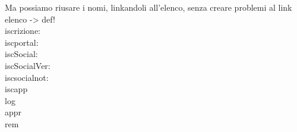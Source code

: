 Ma possiamo riusare i nomi, linkandoli all'elenco, senza creare problemi al link elenco -> def!\\
iscrizione:   \\
iscportal:   \\
iscSocial:   \\
iscSocialVer:   \\
iscsocialnot:   \\
iscapp  \\
log  \\
appr  \\
rem  \\
